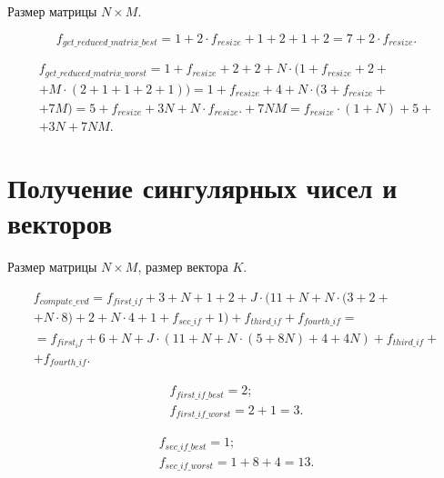 Размер матрицы $N \times M$.

\begin{equation}
	f_{get\_reduced\_matrix\_best} = 1 + 2 \cdot f_{resize} + 1 + 2 + 1 + 2 = 7 + 2 \cdot f_{resize}.
\end{equation}

\begin{equation}
	\begin{gathered}
		f_{get\_reduced\_matrix\_worst} = 1 + f_{resize} + 2 + 2 + N \cdot (1 + f_{resize} + 2 +\\+ M \cdot (2 + 1 + 1 + 2 + 1)) = 1 + f_{resize} + 4 + N \cdot (3 + f_{resize} +\\+ 7M) =
		5 + f_{resize} + 3N + N \cdot f_{resize}. + 7NM = f_{resize} \cdot (1 + N) + 5 +\\+ 3N + 7NM.
	\end{gathered}
\end{equation}



\section{Получение сингулярных чисел и векторов}

Размер матрицы $N \times M$, размер вектора $K$.

\begin{equation}
	\begin{gathered}
		f_{compute\_evd} = f_{first\_if} + 3 + N + 1 + 2 + J \cdot (11 + N + N \cdot (3 + 2 +\\+ N \cdot 8) + 2 + N \cdot 4 + 1 + f_{sec\_if} + 1) + f_{third\_if} + f_{fourth\_if} =\\=
		f_{first_if} + 6 + N + J \cdot (11 + N + N \cdot (5 + 8N) + 4 + 4N) + f_{third\_if} +\\+ f_{fourth\_if}.
	\end{gathered}
\end{equation}

\begin{equation}
	\begin{gathered}
		f_{first\_if\_best} = 2;\\
		f_{first\_if\_worst} = 2 + 1 = 3.
	\end{gathered}
\end{equation}

\begin{equation}
	\begin{gathered}
		f_{sec\_if\_best} = 1;\\
		f_{sec\_if\_worst} = 1 + 8 + 4 = 13.
	\end{gathered}
\end{equation}

